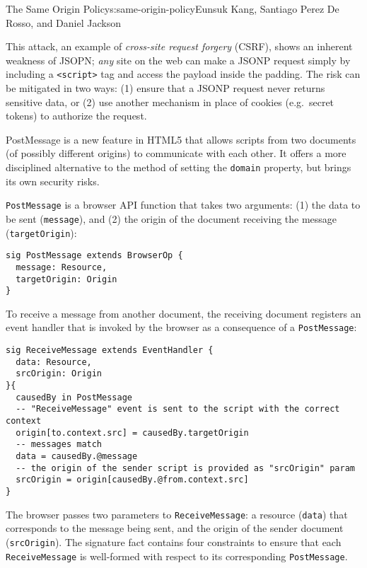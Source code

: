 \begin{aosachapter}{The Same Origin Policy}{s:same-origin-policy}{Eunsuk Kang, Santiago Perez De Rosso, and Daniel Jackson}

This attack, an example of \emph{cross-site request forgery} (CSRF),
shows an inherent weakness of JSOPN; \emph{any} site on the web can make
a JSONP request simply by including a
\texttt{\textless{}script\textgreater{}} tag and access the payload
inside the padding. The risk can be mitigated in two ways: (1) ensure
that a JSONP request never returns sensitive data, or (2) use another
mechanism in place of cookies (e.g.~secret tokens) to authorize the
request.

\label{postmessage}

PostMessage is a new feature in HTML5 that allows scripts from two
documents (of possibly different origins) to communicate with each
other. It offers a more disciplined alternative to the method of setting
the \texttt{domain} property, but brings its own security risks.

\texttt{PostMessage} is a browser API function that takes two arguments:
(1) the data to be sent (\texttt{message}), and (2) the origin of the
document receiving the message (\texttt{targetOrigin}):

\begin{verbatim}
sig PostMessage extends BrowserOp {
  message: Resource,
  targetOrigin: Origin
}
\end{verbatim}

To receive a message from another document, the receiving document
registers an event handler that is invoked by the browser as a
consequence of a \texttt{PostMessage}:

\begin{verbatim}
sig ReceiveMessage extends EventHandler {
  data: Resource,
  srcOrigin: Origin
}{
  causedBy in PostMessage
  -- "ReceiveMessage" event is sent to the script with the correct context
  origin[to.context.src] = causedBy.targetOrigin
  -- messages match
  data = causedBy.@message
  -- the origin of the sender script is provided as "srcOrigin" param 
  srcOrigin = origin[causedBy.@from.context.src]
}
\end{verbatim}

The browser passes two parameters to \texttt{ReceiveMessage}: a resource
(\texttt{data}) that corresponds to the message being sent, and the
origin of the sender document (\texttt{srcOrigin}). The signature fact
contains four constraints to ensure that each \texttt{ReceiveMessage} is
well-formed with respect to its corresponding \texttt{PostMessage}.


\end{aosachapter}
